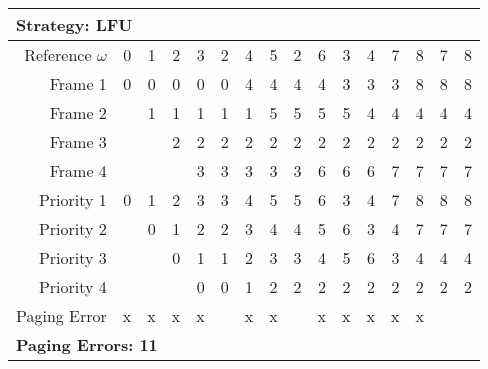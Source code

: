 \documentclass[a4paper, 11pt]{article}
\begin{document}
      \begin{center}
      \begin{tabular}{|r||r|r|r|r|r|r|r|r|r|r|r|r|r|r|r|}
            \multicolumn{16}{l}{\textbf{Strategy: LFU}}\\
            \hline
                  Reference $\omega$ & 0 & 1 & 2 & 3 & 2 & 4 & 5 & 2 & 6 & 3 & 4 & 7 & 8 & 7 & 8 \\
            \hline\hline
                  Frame 1    &0&0&0&0&0&4&4&4&4&3&3&3&8&8&8   \\\hline
                  Frame 2    &&1&1&1&1&1&5&5&5&5&4&4&4&4&4   \\\hline
                  Frame 3    &&&2&2&2&2&2&2&2&2&2&2&2&2&2   \\\hline
                  Frame 4    &&&&3&3&3&3&3&6&6&6&7&7&7&7   \\
            \hline\hline
                  Priority 1 &0&1&2&3&3&4&5&5&6&3&4&7&8&8&8   \\\hline
                  Priority 2 &&0&1&2&2&3&4&4&5&6&3&4&7&7&7   \\\hline
                  Priority 3 &&&0&1&1&2&3&3&4&5&6&3&4&4&4   \\\hline
                  Priority 4 &&&&0&0&1&2&2&2&2&2&2&2&2&2   \\
            \hline\hline
                  Paging Error  &x&x&x&x&&x&x&&x&x&x&x&x&&   \\
            \hline
            \multicolumn{16}{l}{\textbf{Paging Errors: 11}}\\
      \end{tabular}
      \end{center}
\end{document}
